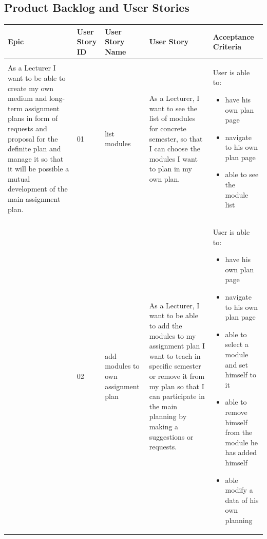 \documentclass{scrartcl}
\begin{document}
\subsection{Product Backlog and User Stories}
\begin{table}[H]
\begin{center}
\begin{tabular}{|p{4cm}|p{0.5cm} |p{3cm}|p{4cm}|p{4cm}|}
\hline
\rowcolor{LightCyan}
 \textbf{Epic} &\textbf{ User Story ID} &\textbf{User Story Name} &\textbf{User Story}  & \textbf{Acceptance Criteria} \\
\hline


As a Lecturer I want to be able to create
 my own medium and long-term assignment plans in form of requests and proposal for the definite plan and manage it so that it will be  possible a mutual development of the main assignment plan. &
01 &
list modules &
 As a Lecturer, I want to see the list of modules for concrete semester, so that I can choose the modules I want to plan in my own plan. &
 
  User is able to:            
\begin{itemize}
\item have his own plan page
\item navigate to his own plan page
\item able to see the module list
\end{itemize}                                                            \\ \hline

 &
 02&
 add modules to own assignment plan&
 
As a Lecturer, I want to be able to add the modules to my assignment plan I want to teach in specific semester or remove  it from my plan so that I can participate in the main planning by making a suggestions or requests.                  &

 User is able to:            
\begin{itemize}
\item have his own plan page
\item navigate to his own plan page
\item able to select a module and set himself to it
\item able to remove himself from the module he has added himself
\item able modify a data of his own planning 
\end{itemize}                                         \\ \hline




\end{tabular}
\end{center}
\end{table}
\end{document}
